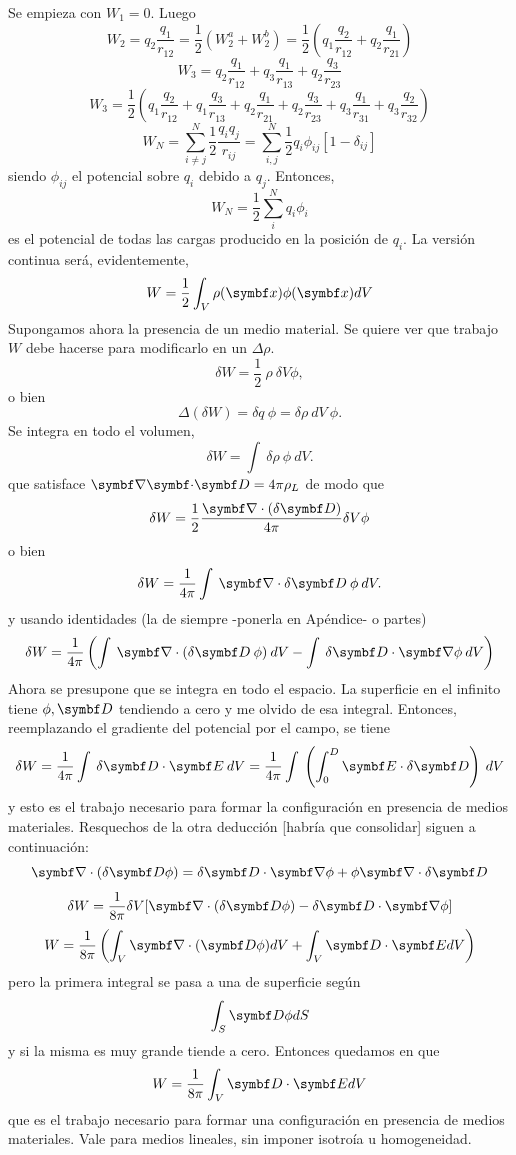 \documentclass[10pt,oneside]{CBFT_book}
\begin{document}
Se empieza con $W_1 = 0 $. Luego
\[
	W_2 = q_2 \frac{q_1}{r_{12}} = \frac{1}{2}( W_2^a + W_2^b ) =
	\frac{1}{2}\left( q_1 \frac{q_2}{r_{12}} + q_2 \frac{q_1}{r_{21}} \right)
\]
\[
	W_3 = q_2 \frac{q_1}{r_{12}} + q_3 \frac{q_1}{r_{13}} + q_2 \frac{q_3}{r_{23}}
\]
\[
	W_3 = \frac{1}{2}\left( q_1 \frac{q_2}{r_{12}} + q_1 \frac{q_3}{r_{13}} + q_2 \frac{q_1}{r_{21}}
		+ q_2 \frac{q_3}{r_{23}} + q_3 \frac{q_1}{r_{31}} + q_3 \frac{q_2}{r_{32}} \right)
\]
\[
	W_N = \sum_{i\neq j}^N \frac{1}{2}\frac{q_i q_j}{r_{ij}} =
	\sum_{i,j}^N \frac{1}{2} q_i \phi_{ij}[ 1 - \delta_{ij}]
\]
siendo $\phi_{ij}$ el potencial sobre $q_i$ debido a $q_j$.
Entonces,
\[
	W_N = \frac{1}{2} \sum_i^N  q_i \phi_i 
\]
es el potencial de todas las cargas producido en la posición de $q_i$.
La versión continua será, evidentemente,
\[
	W = \frac{1}{2} \int_V \rho(\vb{x}) \phi(\vb{x}) dV
\]
Supongamos ahora la presencia de un medio material.
Se quiere ver que trabajo $W$ debe hacerse para modificarlo en un $\Delta \rho$.
\[
	\delta W = \frac{1}{2} \: \rho \: \delta V \phi,
\]
o bien
\[
	\Delta(\delta W) = \delta q \: \phi =  \delta \rho \: dV \: \phi.
\]
Se integra en todo el volumen,
\[
	\delta W = \int \: \delta \rho\: \phi \: dV.
\]
que satisface $\divem{D}=4\pi\rho_L$ de modo que
\[
	\delta W = \frac{1}{2}\frac{\Nabla\cdot(\delta\vb{D})}{4\pi} \delta V \phi 
\]
o bien
\[
	\delta W = \frac{1}{4\pi} \int \: \Nabla \cdot \delta \vb{D} \: \phi \: dV.
\]
y usando identidades (la de siempre -ponerla en Apéndice- o partes)
\[
	\delta W = \frac{1}{4\pi} \left( 
	\int \: \Nabla \cdot ( \delta \vb{D} \: \phi ) \: dV -
	\int \: \delta\vb{D} \cdot \Nabla \phi \: dV
	\right)
\]
Ahora se presupone que se integra en todo el espacio. La superficie en el infinito
tiene $\phi,\vb{D}$ tendiendo a cero y me olvido de esa integral. Entonces, reemplazando
el gradiente del potencial por el campo, se tiene
\[
	\delta W =  \frac{1}{4\pi}  \int \: \delta\vb{D} \cdot \vb{E} \: dV =
	\frac{1}{4\pi}  \int \: \left( \int_0^D \vb{E} \cdot \delta\vb{D} \right) \: dV
\]
y esto es el trabajo necesario para formar la configuración en presencia de medios
materiales.
Resquechos de la otra deducción [habría que consolidar] siguen a continuación:
\[
	\Nabla\cdot(\delta\vb{D}\phi) = \delta\vb{D} \cdot \Nabla\phi  + \phi \Nabla\cdot\delta\vb{D}
\]
\[
	\delta W = \frac{1}{8\pi} \delta V [\Nabla\cdot(\delta\vb{D}\phi) - \delta\vb{D} \cdot \Nabla\phi ]
\]
\[
	W = \frac{1}{8\pi}\left( \int_V \Nabla\cdot(\vb{D}\phi)dV + \int_V \vb{D}\cdot\vb{E} dV \right)
\]
pero la primera integral se pasa a una de superficie según
\[
	\int_S \vb{D}\phi dS
\]
y si la misma es muy grande tiende a cero. Entonces quedamos en que 
\[
	W = \frac{1}{8\pi} \int_V \vb{D}\cdot\vb{E} dV
\]
que es el trabajo necesario para formar una configuración en presencia de medios materiales. Vale
para medios lineales, sin imponer isotroía u homogeneidad.
\end{document}
